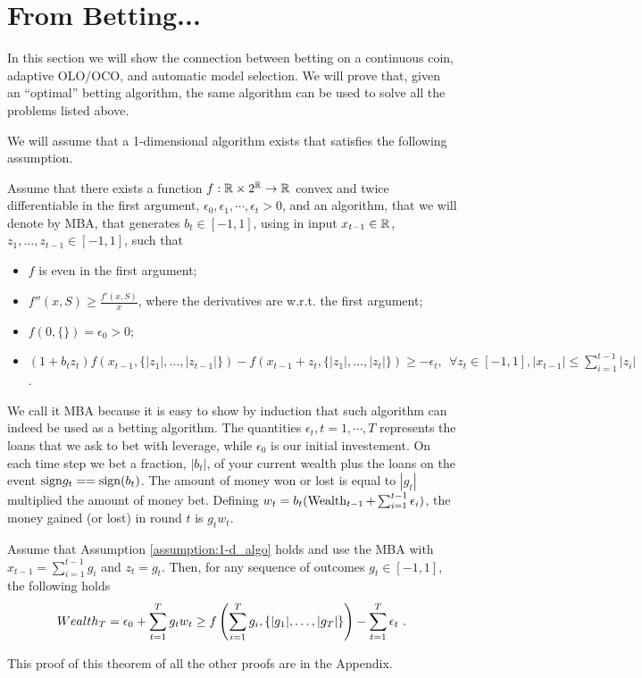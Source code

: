 \section{From Betting...}

In this section we will show the connection between betting on a continuous coin, adaptive \ac{OLO}/\ac{OCO}, and automatic model selection. We will prove that, given an ``optimal'' betting algorithm, the same algorithm can be used to solve all the problems listed above.

We will assume that a 1-dimensional algorithm exists that satisfies the following assumption.
\begin{assumption}
\label{assumption:1-d_algo}
Assume that there exists a function $f:\mathbb{R} \times 2^{\mathbb{R}} \rightarrow \mathbb{R}$ convex and twice differentiable in the first argument, $\epsilon_0, \epsilon_1,\cdots, \epsilon_t>0$, and an algorithm, that we will denote by \ac{MBA}, that generates $b_t \in [-1 , 1]$, using in input $x_{t-1} \in \mathbb{R}$, $z_1, \ldots, z_{t-1} \in [-1,1]$, such that
\begin{itemize}
\item $f$ is even in the first argument;
\item $f''(x, S) \geq \frac{f'(x,S)}{x}$, where the derivatives are w.r.t. the first argument;
\item $f(0,\{\})=\epsilon_0>0$;
\item  $
(1+b_t z_t) f\left( x_{t-1}, \{|z_1|, \ldots, |z_{t-1}|\} \right) - f\left( x_{t-1}+z_t, \{|z_1|, \ldots, |z_t|\}\right) \geq -\epsilon_t, \ \ \forall z_{t} \in [-1,1], |x_{t-1}| \leq \sum_{i=1}^{t-1} |z_i|
$.
\end{itemize}
\end{assumption}

We call it \ac{MBA} because it is easy to show by induction that such algorithm can indeed be used as a betting algorithm.
The quantities $\epsilon_t, t=1,\cdots,T$ represents the loans that we ask to bet with leverage, while $\epsilon_0$ is our initial investement.
On each time step we bet a fraction, $|b_t|$, of your current wealth plus the loans on the event ${\rm sign}{g_t}=={\rm sign}(b_t)$.
The amount of money won or lost is equal to $|g_t|$ multiplied the amount of money bet.
Defining $w_t=b_t (\operatorname{Wealth}_{t-1}+\sum_{i=1}^{t-1} \epsilon_i)$, the money gained (or lost) in round $t$ is $g_t w_t$.
\begin{theorem}
\label{theo:1-d_reward}
Assume that Assumption \ref{assumption:1-d_algo} holds and use the \ac{MBA} with $x_{t-1}=\sum_{i=1}^{t-1} g_i$ and $z_t=g_t$.
Then, for any sequence of outcomes $g_t \in [-1,1]$, the following holds
\[
Wealth_T = \epsilon_0 + \sum_{t=1}^T g_t w_t \geq f\left( \sum_{i=1}^{T} g_i , \left\{|g_1|, \ldots, |g_T|\right\}\right)-\sum_{t=1}^T \epsilon_t~.
\]
\end{theorem}
This proof of this theorem of all the other proofs are in the Appendix.

